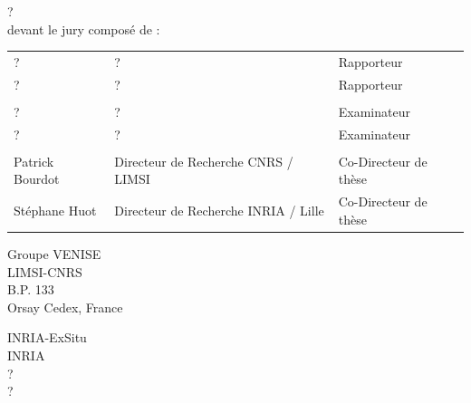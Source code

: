 \begin{titlepage}
?\\

devant le jury composé de :\\
\begin{center}
	\begin{tabular}{l l l}
	
	? 	&?		& Rapporteur\\ 
	?		& ? 		& Rapporteur\\ %
	& &\\
	?	& ?	 	& Examinateur\\ 
	?	& ?				& Examinateur\\ 
	& &\\	
	Patrick Bourdot 	& Directeur de Recherche CNRS / LIMSI				& Co-Directeur de thèse\\ 
	Stéphane Huot	& Directeur de Recherche INRIA / Lille				& Co-Directeur de thèse\\ 
		
	\end{tabular}
\end{center}






\setlength{\columnsep}{7mm}
\setlength{\columnseprule}{0pt}

\begin{multicols}{2} 
\small 
\noindent Groupe VENISE	\\	
\noindent LIMSI-CNRS					\\
\noindent B.P. 133				\\
 Orsay Cedex, France \\	

\columnbreak

\raggedleft INRIA-ExSitu \\
\noindent INRIA \\
\noindent ?  \\
\noindent ?
\end{multicols}



\end{titlepage}